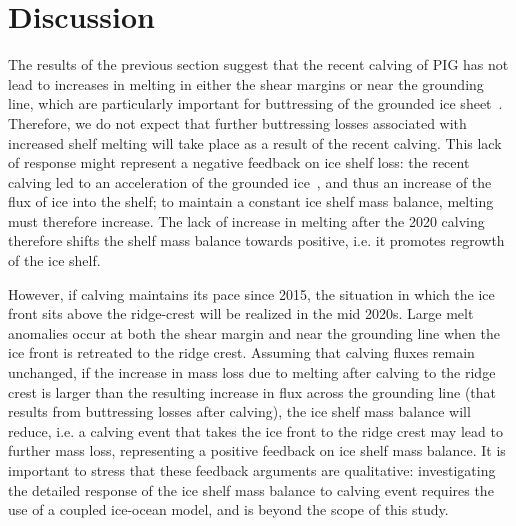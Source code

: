 \documentclass[draft]{agujournal2019}
\begin{document}


\section{Discussion}\label{S:Discussion}
The results of the previous section suggest that the recent calving of PIG has not lead to increases in melting in either the shear margins or near the grounding line, which are particularly important for buttressing of the grounded ice sheet~\cite{Furst2016NatureClimCh, Reese2018NatureClimCh}. Therefore, we do not expect that further buttressing losses associated with increased shelf melting will take place as a result of the recent calving. This lack of response might represent a negative feedback on ice shelf loss: the recent calving led to an acceleration of the grounded ice~\cite{Joughin2021ScienceAdv}, and thus an increase of the flux of ice into the shelf; to maintain a constant ice shelf mass balance, melting must therefore increase. The lack of increase in melting after the 2020 calving therefore shifts the shelf mass balance towards positive, i.e. it promotes regrowth of the ice shelf.

However, if calving maintains its pace since 2015, the situation in which the ice front sits above the ridge-crest will be realized in the mid 2020s. Large melt anomalies occur at both the shear margin and near the grounding line when the ice front is retreated to the ridge crest. Assuming that calving fluxes remain unchanged, if the increase in mass loss due to melting after calving to the ridge crest is larger than the resulting increase in flux across the grounding line (that results from buttressing losses after calving), the ice shelf mass balance will reduce, i.e. a calving event that takes the ice front to the ridge crest may lead to further mass loss, representing a positive feedback on ice shelf mass balance. It is important to stress that these feedback arguments are qualitative: investigating the detailed response of the ice shelf mass balance to calving event requires the use of a coupled ice-ocean model, and is beyond the scope of this study.
\end{document}

